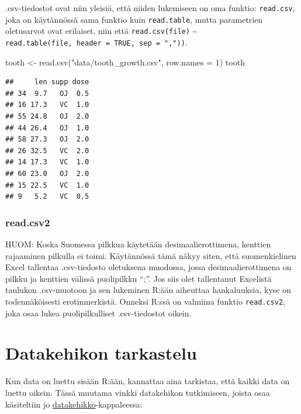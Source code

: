 \documentclass[
]{book}
\newenvironment{Shaded}{\begin{snugshade}}{\end{snugshade}}
\newcommand{\AttributeTok}[1]{\textcolor[rgb]{0.77,0.63,0.00}{#1}}
\newcommand{\DecValTok}[1]{\textcolor[rgb]{0.00,0.00,0.81}{#1}}
\newcommand{\FunctionTok}[1]{\textcolor[rgb]{0.00,0.00,0.00}{#1}}
\newcommand{\NormalTok}[1]{#1}
\newcommand{\OtherTok}[1]{\textcolor[rgb]{0.56,0.35,0.01}{#1}}
\newcommand{\StringTok}[1]{\textcolor[rgb]{0.31,0.60,0.02}{#1}}
\begin{document}
.csv-tiedostot ovat niin yleisiä, että niiden lukemiseen on oma funktio: \texttt{read.csv}, joka on käytännössä sama funktio kuin \texttt{read.table}, mutta parametrien oletusarvot ovat erilaiset, niin että \texttt{read.csv(file)} \textasciitilde{} \texttt{read.table(file,\ header\ =\ TRUE,\ sep\ =\ ","))}.

\begin{Shaded}
\begin{Highlighting}[]
\NormalTok{tooth }\OtherTok{\textless{}{-}} \FunctionTok{read.csv}\NormalTok{(}\StringTok{"data/tooth\_growth.csv"}\NormalTok{, }\AttributeTok{row.names =} \DecValTok{1}\NormalTok{)}
\NormalTok{tooth}
\end{Highlighting}
\end{Shaded}

\begin{verbatim}
##     len supp dose
## 34  9.7   OJ  0.5
## 16 17.3   VC  1.0
## 55 24.8   OJ  2.0
## 44 26.4   OJ  1.0
## 58 27.3   OJ  2.0
## 26 32.5   VC  2.0
## 14 17.3   VC  1.0
## 60 23.0   OJ  2.0
## 15 22.5   VC  1.0
## 9   5.2   VC  0.5
\end{verbatim}

\hypertarget{read.csv2}{%
\subsubsection{read.csv2}\label{read.csv2}}

HUOM: Koska Suomessa pilkkua käytetään desimaalierottimena, kenttien rajaaminen pilkulla ei toimi. Käytännössä tämä näkyy siten, että suomenkielinen Excel tallentaa .csv-tiedosto oletuksena muodossa, jossa desimaalierottimena on pilkku ja kenttien välissä puolipilkku ``;''. Jos siis olet tallentanut Excelistä taulukon .csv-muotoon ja sen lukeminen R:ään aiheuttaa hankaluuksia, kyse on todennäköisesti erotinmerkistä. Onneksi R:ssä on valmiina funktio \texttt{read.csv2}, joka osaa lukea puolipilkulliset .csv-tiedostot oikein.

\hypertarget{datakehikon-tarkastelu}{%
\section{Datakehikon tarkastelu}\label{datakehikon-tarkastelu}}

Kun data on luettu sisään R:ään, kannattaa aina tarkistaa, että kaikki data on luettu oikein. Tässä muutama vinkki datakehikon tutkimiseen, joista osaa käsiteltiin jo \protect\hyperlink{data-frame}{datakehikko}-kappaleessa:
\end{document}
